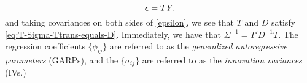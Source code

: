 \documentclass[12pt]{article}
\newcommand{\bfeps}{\mbox{\boldmath $\epsilon$}}
\theoremstyle{definition}
\begin{document}
{{\begin{equation}
\bfeps = T Y \label{eq:vectorized-ar-model}.
\end{equation}
\noindent
and taking covariances on both sides of \eqref{epsilon}, we see that $T$ and $D$ satisfy \ref{eq:T-Sigma-Ttrans-equals-D}. Immediately, we have that $\Sigma^{-1} = T' D^{-1} T$. The regression coefficients $\lbrace \phi_{ij} \rbrace$ are referred to as the \emph{generalized autoregressive parameters} (GARPs), and the $\lbrace \sigma_{ij} \rbrace$ are referred to as the \emph{innovation variances} (IVs.) 
\bigskip
%
%
%
%
\bigskip

}}
\end{document}
